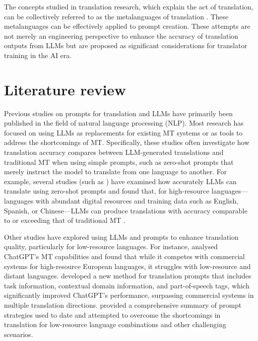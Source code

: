 \documentclass[output=paper,colorlinks,citecolor=brown, japanesefont]{langscibook}
\begin{document}
The concepts studied in translation research, which explain the act of translation, can be collectively referred to as the metalanguages of translation \citep{Miyata2023}. These metalanguages can be effectively applied to prompt creation. These attempts are not merely an engineering perspective to enhance the accuracy of translation outputs from LLMs but are proposed as significant considerations for translator training in the AI era.

\section{Literature review}

Previous studies on prompts for translation and LLMs have primarily been published in the field of natural language processing (NLP). Most research has focused on using LLMs as replacements for existing MT systems or as tools to address the shortcomings of MT. Specifically, these studies often investigate how translation accuracy compares between LLM-generated translations and traditional MT when using simple prompts, such as zero-shot prompts that merely instruct the model to translate from one language to another. For example, several studies (such as \citealt{hendy2023goodgptmodelsmachine, jiao2023chatgptgoodtranslatoryes, wang-etal-2023-document-level}) have examined how accurately LLMs can translate using zero-shot prompts and found that, for high-resource languages—languages with abundant digital resources and training data such as English, Spanish, or Chinese—LLMs can produce translations with accuracy comparable to or exceeding that of traditional MT \citep{way2025}.

Other studies have explored using LLMs and prompts to enhance translation quality, particularly for low-resource languages. For instance, \textcite{jiao2023chatgptgoodtranslatoryes} analysed ChatGPT's MT capabilities and found that while it competes with commercial systems for high-resource European languages, it struggles with low-resource and distant languages. \textcite{gao2023designtranslationpromptschatgpt} developed a new method for translation prompts that includes task information, contextual domain information, and part-of-speech tags, which significantly improved ChatGPT's performance, surpassing commercial systems in multiple translation directions. \textcite{Zhang2023} provided a comprehensive summary of prompt strategies used to date and attempted to overcome the shortcomings in translation for low-resource language combinations and other challenging scenarios.
\end{document}
